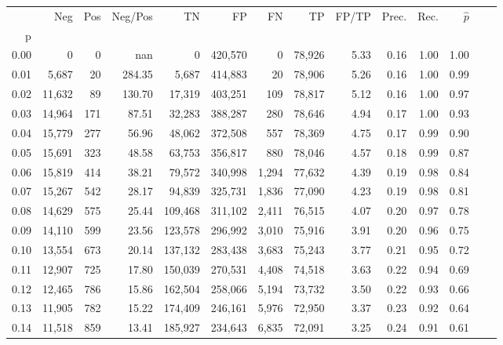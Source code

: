 \begin{tabular}{rrrrrrrrrrrrrr}
\toprule
{} &     Neg &    Pos & Neg/Pos &       TN &       FP &      FN &      TP & FP/TP & Prec. &  Rec. & $\hat{p}$ \\
p    &         &        &         &          &          &         &         &       &       &       &           \\
\midrule
0.00 &       0 &      0 &     nan &        0 &  420,570 &       0 &  78,926 &  5.33 &  0.16 &  1.00 &      1.00 \\
0.01 &   5,687 &     20 &  284.35 &    5,687 &  414,883 &      20 &  78,906 &  5.26 &  0.16 &  1.00 &      0.99 \\
0.02 &  11,632 &     89 &  130.70 &   17,319 &  403,251 &     109 &  78,817 &  5.12 &  0.16 &  1.00 &      0.97 \\
0.03 &  14,964 &    171 &   87.51 &   32,283 &  388,287 &     280 &  78,646 &  4.94 &  0.17 &  1.00 &      0.93 \\
0.04 &  15,779 &    277 &   56.96 &   48,062 &  372,508 &     557 &  78,369 &  4.75 &  0.17 &  0.99 &      0.90 \\
0.05 &  15,691 &    323 &   48.58 &   63,753 &  356,817 &     880 &  78,046 &  4.57 &  0.18 &  0.99 &      0.87 \\
0.06 &  15,819 &    414 &   38.21 &   79,572 &  340,998 &   1,294 &  77,632 &  4.39 &  0.19 &  0.98 &      0.84 \\
0.07 &  15,267 &    542 &   28.17 &   94,839 &  325,731 &   1,836 &  77,090 &  4.23 &  0.19 &  0.98 &      0.81 \\
0.08 &  14,629 &    575 &   25.44 &  109,468 &  311,102 &   2,411 &  76,515 &  4.07 &  0.20 &  0.97 &      0.78 \\
0.09 &  14,110 &    599 &   23.56 &  123,578 &  296,992 &   3,010 &  75,916 &  3.91 &  0.20 &  0.96 &      0.75 \\
0.10 &  13,554 &    673 &   20.14 &  137,132 &  283,438 &   3,683 &  75,243 &  3.77 &  0.21 &  0.95 &      0.72 \\
0.11 &  12,907 &    725 &   17.80 &  150,039 &  270,531 &   4,408 &  74,518 &  3.63 &  0.22 &  0.94 &      0.69 \\
0.12 &  12,465 &    786 &   15.86 &  162,504 &  258,066 &   5,194 &  73,732 &  3.50 &  0.22 &  0.93 &      0.66 \\
0.13 &  11,905 &    782 &   15.22 &  174,409 &  246,161 &   5,976 &  72,950 &  3.37 &  0.23 &  0.92 &      0.64 \\
0.14 &  11,518 &    859 &   13.41 &  185,927 &  234,643 &   6,835 &  72,091 &  3.25 &  0.24 &  0.91 &      0.61 \\

\end{tabular}

